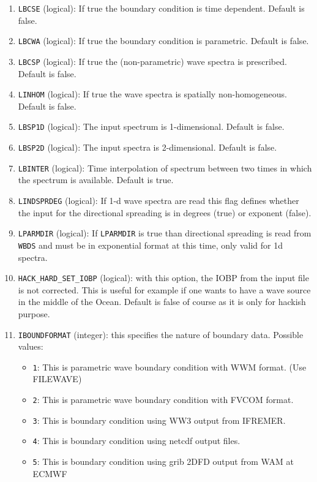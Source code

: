 \documentclass[12pt]{amsart}
\begin{document}
\begin{enumerate}
\item {\tt LBCSE} (logical): If true the boundary condition is time dependent. Default is false.
\item {\tt LBCWA} (logical): If true the boundary condition is parametric. Default is false.
\item {\tt LBCSP} (logical): If true the (non-parametric) wave spectra is prescribed. Default is false.
\item {\tt LINHOM} (logical): If true the wave spectra is spatially non-homogeneous. Default is false.
\item {\tt LBSP1D} (logical): The input spectrum is 1-dimensional. Default is false.
\item {\tt LBSP2D} (logical): The input spectra is 2-dimensional. Default is false.
\item {\tt LBINTER} (logical): Time interpolation of spectrum between two times in which the spectrum is available. Default is true.
\item {\tt LINDSPRDEG} (logical): If 1-d wave spectra are read this flag defines whether the input for the directional spreading is in degrees (true) or exponent (false).
\item {\tt LPARMDIR} (logical): If {\tt LPARMDIR} is true than directional spreading is read from {\tt WBDS} and must be in exponential format at this time, only valid for 1d spectra.
\item {\tt HACK\_HARD\_SET\_IOBP} (logical): with this option, the IOBP from the input file is not corrected. This is useful for example if one wants to have a wave source in the middle of the Ocean. Default is false of course as it is only for hackish purpose.
\item {\tt IBOUNDFORMAT} (integer): this specifies the nature of boundary data. Possible values:
  \begin{itemize}
  \item {\tt 1}: This is parametric wave boundary condition with WWM format. (Use FILEWAVE)
  \item {\tt 2}: This is parametric wave boundary condition with FVCOM format. 
  \item {\tt 3}: This is boundary condition using WW3 output from IFREMER.
  \item {\tt 4}: This is boundary condition using netcdf output files.
  \item {\tt 5}: This is boundary condition using grib 2DFD output from WAM at ECMWF
  \end{itemize}

\end{enumerate}
\end{document}

